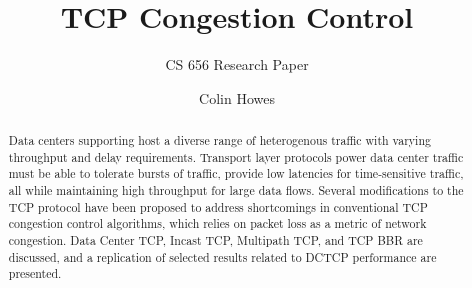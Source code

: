\documentclass[sigconf]{acmart}
\begin{document}
\title{TCP Congestion Control}
\subtitle{CS 656 Research Paper}


\author{Colin Howes}

\begin{abstract}

Data centers supporting host a diverse range of heterogenous traffic with varying throughput and delay requirements. Transport layer protocols power data center traffic must be able to tolerate bursts of traffic, provide low latencies for time-sensitive traffic, all while maintaining high throughput for large data flows. Several modifications to the TCP protocol have been proposed to address shortcomings in conventional TCP congestion control algorithms, which relies on packet loss as a metric of network congestion. Data Center TCP, Incast TCP, Multipath TCP, and TCP BBR are discussed, and a replication of selected results related to DCTCP performance are presented.

\end{abstract}

\maketitle




 
\end{document}
